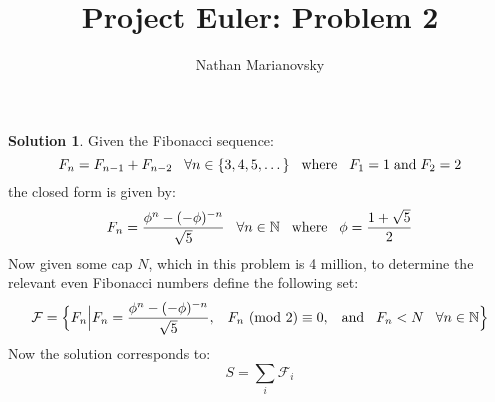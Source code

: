 \documentclass[12pt, letterpaper, onecolumn, conference, final]{IEEEtran}
\title{Project Euler: Problem 2}
\author{Nathan Marianovsky}
\newcommand{\Mod}[1]{\ (\text{mod}\ #1)}
\theoremstyle{definition}
\newtheorem*{problem*}{Problem}
\newtheorem*{solution*}{Solution}
\theoremstyle{plain}
\begin{document}
\maketitle

\begin{center}
\end{center}

\vspace{.3cm}
\begin{solution*}
Given the Fibonacci sequence:
\begin{equation*}
F_n = F_{n-1} + F_{n-2} \hspace{.3cm} \forall n \in \{3,4,5,\dots\} \hspace{.3cm} \text{where} \hspace{.3cm} F_1 = 1 \hspace{.1cm} \text{and} \hspace{.1cm} F_2 = 2
\end{equation*}
the closed form is given by:
\begin{equation*}
F_n = \frac{\phi^n - (-\phi)^{-n}}{\sqrt{5}} \hspace{.3cm} \forall n \in \mathbb{N} \hspace{.3cm} \text{where} \hspace{.3cm} \phi = \frac{1+\sqrt{5}}{2}
\end{equation*}
Now given some cap $N$, which in this problem is 4 million, to determine the relevant even Fibonacci numbers define the following set:
\begin{equation*}
\mathcal{F} = \Big\{ F_n \Big| F_n = \frac{\phi^n - (-\phi)^{-n}}{\sqrt{5}}, \hspace{.3cm} F_n \Mod 2 \equiv 0, \hspace{.3cm} \text{and} \hspace{.3cm} F_n < N \hspace{.3cm} \forall n \in \mathbb{N} \Big\}
\end{equation*}
Now the solution corresponds to:
\begin{equation*}
S = \sum_{i} \mathcal{F}_i
\end{equation*}
\end{solution*}
\end{document}
